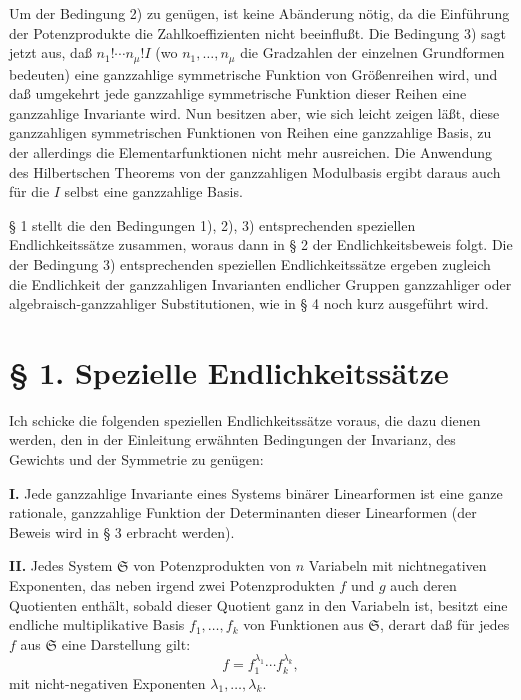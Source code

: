 \documentclass[11pt]{article}
\providecommand{\frS}{\mathfrak S}
\begin{document}
Um der Bedingung 2) zu genügen, ist keine Abänderung nötig, da die Einführung der Potenzprodukte die Zahlkoeffizienten nicht beeinflußt. Die Bedingung 3) sagt jetzt aus, daß \(n_1!\cdots n_\mu! I\) (wo \(n_1,\ldots,n_\mu\) die Gradzahlen der einzelnen Grundformen bedeuten) eine ganzzahlige symmetrische Funktion von Größenreihen wird, und daß umgekehrt jede ganzzahlige symmetrische Funktion dieser Reihen eine ganzzahlige Invariante wird. Nun besitzen aber, wie sich leicht zeigen läßt, diese ganzzahligen symmetrischen Funktionen von Reihen eine ganzzahlige Basis, zu der allerdings die Elementarfunktionen nicht mehr ausreichen. Die Anwendung des Hilbertschen Theorems von der ganzzahligen Modulbasis ergibt daraus auch für die \(I\) selbst eine ganzzahlige Basis.

§ 1 stellt die den Bedingungen 1), 2), 3) entsprechenden speziellen Endlichkeitssätze zusammen, woraus dann in § 2 der Endlichkeitsbeweis folgt. Die der Bedingung 3) entsprechenden speziellen Endlichkeitssätze ergeben zugleich die Endlichkeit der ganzzahligen Invarianten endlicher Gruppen ganzzahliger oder algebraisch-ganzzahliger Substitutionen, wie in § 4 noch kurz ausgeführt wird.

\section*{§ 1. Spezielle Endlichkeitssätze}

Ich schicke die folgenden speziellen Endlichkeitssätze voraus, die dazu dienen werden, den in der Einleitung erwähnten Bedingungen der Invarianz, des Gewichts und der Symmetrie zu genügen:

\textbf{I.} Jede ganzzahlige Invariante eines Systems binärer Linearformen ist eine ganze rationale, ganzzahlige Funktion der Determinanten dieser Linearformen (der Beweis wird in § 3 erbracht werden).

\textbf{II.} Jedes System \(\frS\) von Potenzprodukten von \(n\) Variabeln mit nichtnegativen Exponenten, das neben irgend zwei Potenzprodukten \(f\) und \(g\) auch deren Quotienten enthält, sobald dieser Quotient ganz in den Variabeln ist, besitzt eine endliche multiplikative Basis \(f_1,\ldots,f_k\) von Funktionen aus \(\frS\), derart daß für jedes \(f\) aus \(\frS\) eine Darstellung gilt:
\[
        f=f_1^{\lambda_1}\cdots f_k^{\lambda_k},
\]
mit nicht-negativen Exponenten \(\lambda_1,\ldots,\lambda_k\).
\end{document}
